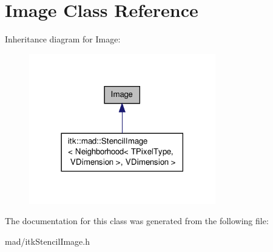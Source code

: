 \hypertarget{class_image}{\section{Image Class Reference}
\label{class_image}
}


Inheritance diagram for Image\-:
\nopagebreak
\begin{figure}[H]
\begin{center}
\leavevmode
\includegraphics[width=230pt]{class_image__inherit__graph}
\end{center}
\end{figure}


The documentation for this class was generated from the following file\-:\begin{DoxyCompactItemize}
\item 
mad/itk\-Stencil\-Image.\-h\end{DoxyCompactItemize}
